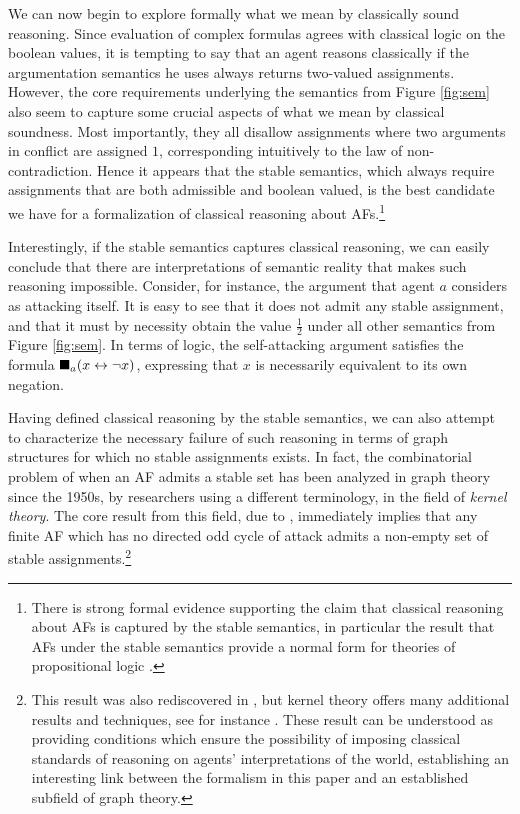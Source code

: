 \documentclass[greybox]{svmult}
\begin{document}
We can now begin to explore formally what we mean by classically sound reasoning. Since evaluation of complex formulas agrees with classical logic on the boolean values, it is tempting to say that an agent reasons classically if the argumentation semantics he uses always returns two-valued assignments. However, the core requirements underlying the semantics from Figure \ref{fig:sem} also seem to capture some crucial aspects of what we mean by classical soundness. Most importantly, they all disallow assignments where two arguments in conflict are assigned $1$, corresponding intuitively to the law of non-contradiction. Hence it appears that the stable semantics, which always require assignments that are both admissible and boolean valued, is the best candidate we have for a formalization of classical reasoning about AFs.\footnote{There is strong formal evidence supporting the claim that classical reasoning about AFs is captured by the stable semantics, in particular the result that AFs under the stable semantics provide a normal form for theories of propositional logic \cite{bezem}.}

Interestingly, if the stable semantics captures classical reasoning, we can easily conclude that there are interpretations of semantic reality that makes such reasoning impossible. Consider, for instance, the argument that agent $a$ considers as attacking itself. It is easy to see that it does not admit any stable assignment, and that it must by necessity obtain the value $\frac{1}{2}$ under all other semantics from Figure \ref{fig:sem}. In terms of logic, the self-attacking argument satisfies the formula $\blacksquare_a (x \leftrightarrow \neg x)$, expressing that $x$ is necessarily equivalent to its own negation.

Having defined classical reasoning by the stable semantics, we can also attempt to characterize the necessary failure of such reasoning in terms of graph structures for which no stable assignments exists. In fact, the combinatorial problem of when an AF admits a stable set has been analyzed in graph theory since the 1950s, by researchers using a different terminology, in the field of \emph{kernel theory}. The core result from this field, due to \cite{richardson}, immediately implies that any finite AF which has no directed odd cycle of attack admits a non-empty set of stable assignments.\footnote{This result was also rediscovered in \cite{dung}, but kernel theory offers many additional results and techniques, see for instance \cite{sanches}. These result can be understood as providing conditions which ensure the possibility of imposing classical standards of reasoning on agents' interpretations of the world, establishing an interesting link between the formalism in this paper and an established subfield of graph theory.}
\end{document}
